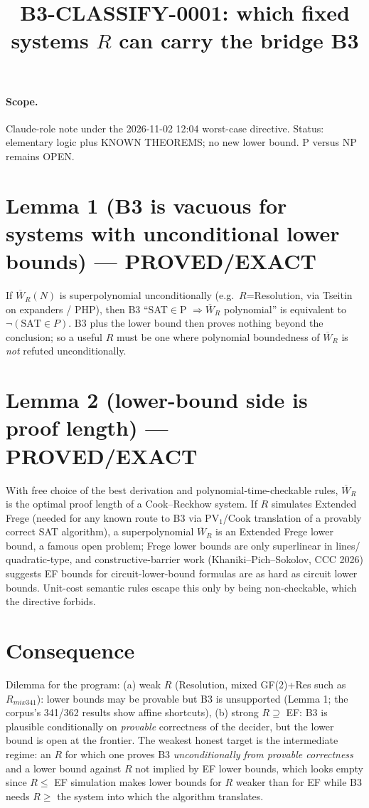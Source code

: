 \documentclass{article}\usepackage{amsmath,amssymb}
\title{B3-CLASSIFY-0001: which fixed systems $R$ can carry the bridge B3}
\begin{document}
\maketitle
\paragraph{Scope.} Claude-role note under the 2026-11-02 12:04 worst-case directive. Status: elementary logic plus KNOWN THEOREMS; no new lower bound. P versus NP remains OPEN.
\section*{Lemma 1 (B3 is vacuous for systems with unconditional lower bounds) --- PROVED/EXACT}
If $\overline W_R(N)$ is superpolynomial unconditionally (e.g.\ $R$=Resolution, via Tseitin on expanders / PHP), then B3 ``SAT$\in$P $\Rightarrow\overline W_R$ polynomial'' is equivalent to $\neg(\text{SAT}\in P)$. B3 plus the lower bound then proves nothing beyond the conclusion; so a useful $R$ must be one where polynomial boundedness of $\overline W_R$ is \emph{not} refuted unconditionally.
\section*{Lemma 2 (lower-bound side is proof length) --- PROVED/EXACT}
With free choice of the best derivation and polynomial-time-checkable rules, $\overline W_R$ is the optimal proof length of a Cook--Reckhow system. If $R$ simulates Extended Frege (needed for any known route to B3 via PV$_1$/Cook translation of a provably correct SAT algorithm), a superpolynomial $\overline W_R$ is an Extended Frege lower bound, a famous open problem; Frege lower bounds are only superlinear in lines/ quadratic-type, and constructive-barrier work (Khaniki--Pich--Sokolov, CCC 2026) suggests EF bounds for circuit-lower-bound formulas are as hard as circuit lower bounds. Unit-cost semantic rules escape this only by being non-checkable, which the directive forbids.
\section*{Consequence}
Dilemma for the program: (a) weak $R$ (Resolution, mixed GF(2)+Res such as $R_{mix341}$): lower bounds may be provable but B3 is unsupported (Lemma 1; the corpus's 341/362 results show affine shortcuts), (b) strong $R\supseteq$ EF: B3 is plausible conditionally on \emph{provable} correctness of the decider, but the lower bound is open at the frontier. The weakest honest target is the intermediate regime: an $R$ for which one proves B3 \emph{unconditionally from provable correctness} and a lower bound against $R$ not implied by EF lower bounds, which looks empty since $R\le$ EF simulation makes lower bounds for $R$ weaker than for EF while B3 needs $R\ge$ the system into which the algorithm translates.
\end{document}
